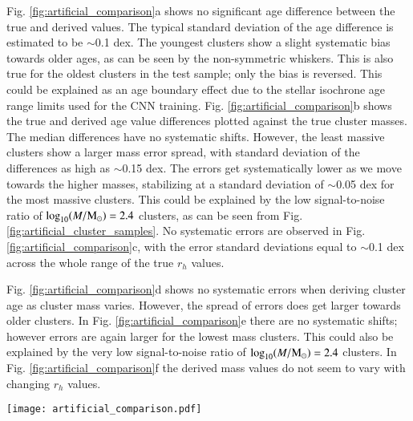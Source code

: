 \documentclass{aa}
\begin{document}
Fig. \ref{fig:artificial_comparison}a shows no significant age difference between the true and derived values. The typical standard deviation of the age difference is estimated to be $\sim$0.1 dex. The youngest clusters show a slight systematic bias towards older ages, as can be seen by the non-symmetric whiskers. This is also true for the oldest clusters in the test sample; only the bias is reversed. This could be explained as an age boundary effect due to the stellar isochrone age range limits used for the CNN training. Fig. \ref{fig:artificial_comparison}b shows the true and derived age value differences plotted against the true cluster masses. The median differences have no systematic shifts. However, the least massive clusters show a larger mass error spread, with standard deviation of the differences as high as $\sim$0.15 dex. The errors get systematically lower as we move towards the higher masses, stabilizing at a standard deviation of $\sim$0.05 dex for the most massive clusters. This could be explained by the low signal-to-noise ratio of $\log_{10}(M/{\rm M_\odot})=2.4$ clusters, as can be seen from Fig. \ref{fig:artificial_cluster_samples}. No systematic errors are observed in Fig. \ref{fig:artificial_comparison}c, with the error standard deviations equal to $\sim$0.1 dex across the whole range of the true $r_h$ values.

Fig. \ref{fig:artificial_comparison}d shows no systematic errors when deriving cluster age as cluster mass varies. However, the spread of errors does get larger towards older clusters. In Fig. \ref{fig:artificial_comparison}e there are no systematic shifts; however errors are again larger for the lowest mass clusters. This could also be explained by the very low signal-to-noise ratio of $\log_{10}(M/{\rm M_\odot})=2.4$ clusters. In Fig. \ref{fig:artificial_comparison}f the derived mass values do not seem to vary with changing $r_h$ values.

\begin{figure*}
    \centering
    \texttt{[image: artificial\_comparison.pdf]}
    \caption{Differences between CNN derived and true parameters vs. true parameter (age, mass, and size) values of artificial clusters. The ages are binned into 0.5 dex width bins, and the masses into 0.3 dex width bins, while $r_h$ bins correspond to EFF model parameters indicated by dots on the constant $r_h$ values in Fig. \ref{fig:eff_rad_construction}. The widths of the boxes for age and mass correspond to half the widths of the bins. The spread of the parameter differences are displayed as box plots. The line in the middle of each box is the median error. Boxes extend from the 1st to the 3rd quartiles. The whiskers denote the range between the 2th and 98th percentiles. Anything above and below the whiskers is plotted as separate points.}
    \label{fig:artificial_comparison}
\end{figure*}
\end{document}
